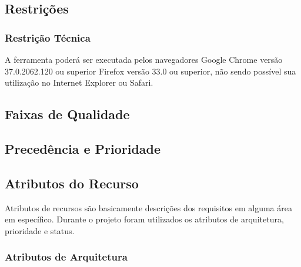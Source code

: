 \subsection{Restrições}
\subsubsection{Restrição Técnica}

A ferramenta poderá ser executada pelos navegadores Google Chrome versão 37.0.2062.120 ou superior Firefox versão 33.0 ou superior, não sendo possível sua utilização no Internet Explorer ou Safari.


\subsection{Faixas de Qualidade}


\subsection{Precedência e Prioridade}


\subsection{Atributos do Recurso}

Atributos de recursos são basicamente descrições dos requisitos em alguma área em específico. Durante o projeto foram utilizados os atributos de arquitetura, prioridade e status.

\subsubsection{Atributos de Arquitetura\\}

